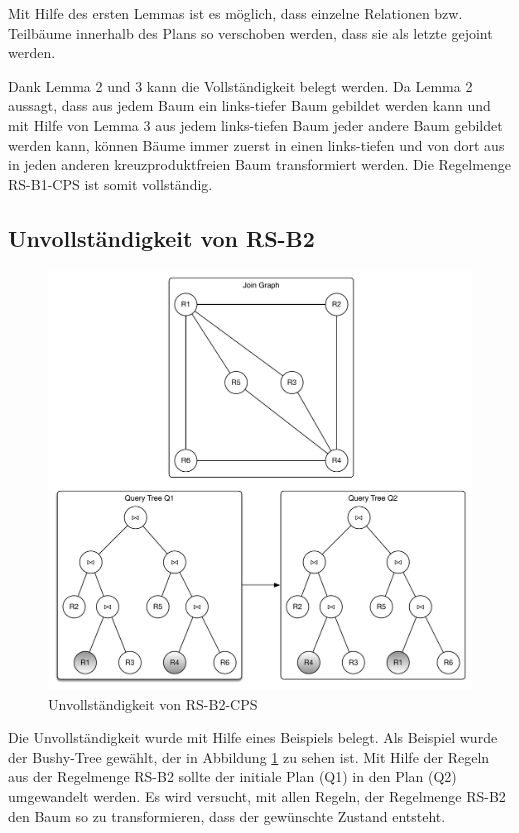 Mit Hilfe des ersten Lemmas ist es möglich, dass einzelne Relationen bzw. Teilbäume innerhalb des Plans so verschoben werden, dass sie als letzte gejoint werden.

Dank Lemma 2 und 3 kann die Vollständigkeit belegt werden. Da Lemma 2 aussagt, dass aus jedem Baum ein links-tiefer Baum gebildet werden kann und mit Hilfe von Lemma 3 aus jedem links-tiefen Baum jeder andere Baum gebildet werden kann, können Bäume immer zuerst in einen links-tiefen und von dort aus in jeden anderen kreuzproduktfreien Baum transformiert werden. Die Regelmenge RS-B1-CPS ist somit vollständig. 






\subsection{Unvollständigkeit von RS-B2}


\begin{figure}[ht]
  \centering
  \includegraphics[width=\textwidth]{02_Related_Work/Graphs.pdf}
  \caption{Unvollständigkeit von RS-B2-CPS}
  \label{Incompleteness_RS-B2-CPS}
\end{figure}


Die Unvollständigkeit wurde mit Hilfe eines Beispiels belegt. Als Beispiel wurde der Bushy-Tree gewählt, der in Abbildung \ref{Incompleteness_RS-B2-CPS} zu sehen ist. Mit Hilfe der Regeln aus der Regelmenge RS-B2 sollte der initiale Plan (Q1) in den Plan (Q2) umgewandelt werden. Es wird versucht,  mit allen Regeln, der Regelmenge RS-B2 den Baum so zu transformieren, dass der gewünschte Zustand entsteht.

